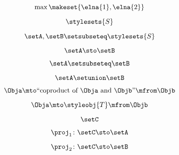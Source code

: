 \begin{forslides}
    \begin{equation}
        \label{eq:combination-143}
        \max\makeset{\elna{1},\elna{2}}
    \end{equation}
    
     \begin{equation}
        \label{eq:combination-144}
        \stylesets{S}
    \end{equation}
    
     \begin{equation}
        \label{eq:combination-145}
        \setA,\setB\setsubseteq \stylesets{S}
    \end{equation}
    
    \begin{equation}
        \label{eq:combination-146}
        \setA \sto \setB
    \end{equation}
    
     \begin{equation}
        \label{eq:combination-147}
        \setA\setsubseteq \setB
    \end{equation}
    
     \begin{equation}
        \label{eq:combination-148}
        \setA\setunion\setB
    \end{equation}
    
    \begin{equation}
        \label{eq:combination-149}
        \Obja \mto \text{``coproduct of } \Obja \text{ and } \Objb \text{''}  \mfrom \Objb
    \end{equation}
    
       \begin{equation}
        \label{eq:combination-150}
         \Obja \mto \styleobj{T} \mfrom \Objb
    \end{equation}
       
     \begin{equation}
        \label{eq:combination-151}
        \setC
    \end{equation}
    
     \begin{equation}
        \label{eq:combination-152}
        \proj_1\colon \setC \sto \setA
    \end{equation}
    
    \begin{equation}
        \label{eq:combination-153}
        \proj_2\colon \setC \sto \setB
    \end{equation}
    

\end{forslides}
